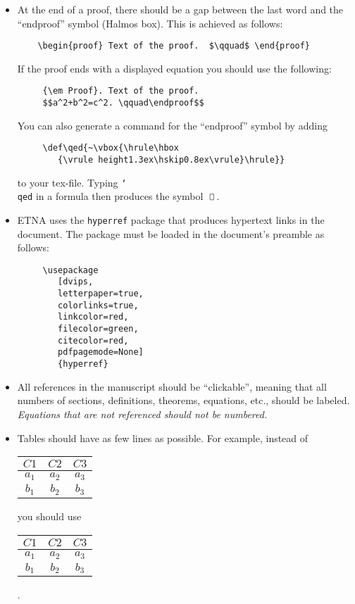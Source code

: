 \documentclass{scrartcl}
\def\qed{~\vbox{\hrule\hbox{\vrule height1.3ex\hskip0.8ex\vrule}\hrule}}
\begin{document}
\begin{itemize}
%
\item  At the end of a proof, there should be a gap between the last word and
  the ``endproof'' symbol (Halmos box). This is achieved as follows:
%
\begin{verbatim}
    \begin{proof} Text of the proof.  $\qquad$ \end{proof}
\end{verbatim}
%
If the proof ends with a displayed equation you should use the following:
%
\begin{verbatim}
     {\em Proof}. Text of the proof.
     $$a^2+b^2=c^2. \qquad\endproof$$
\end{verbatim}
%
You can also generate a command for the ``endproof'' symbol by adding
%
\begin{verbatim}
     \def\qed{~\vbox{\hrule\hbox
        {\vrule height1.3ex\hskip0.8ex\vrule}\hrule}}
\end{verbatim}
%
to your tex-file. Typing \texttt{\char`\\qed} in a formula then produces
the symbol $\qed\,$.
%
\item ETNA uses the \texttt{hyperref} package that produces hypertext links in
  the document. The package must be loaded in the document's preamble as
  follows:
%
\begin{verbatim}
     \usepackage
        [dvips,
        letterpaper=true,
        colorlinks=true,
        linkcolor=red,
        filecolor=green,
        citecolor=red,
        pdfpagemode=None]
        {hyperref}
\end{verbatim}

\item All references in the manuscript should be ``clickable'', meaning that
  all numbers of sections, definitions, theorems, equations, etc., should be
  labeled. \emph{Equations that are not referenced should not be numbered.}
%
\item Tables should have as few lines as possible. For example, instead of
\begin{table}[h]
  \centering
  \begin{tabular}{|c|c|c|}\hline
  $C1$ & $C2$ & $C3$ \\ \hline
  $a_1$ & $a_2$ & $a_3$ \\ \hline
  $b_1$ & $b_2$ & $b_3$ \\ \hline
  \end{tabular}
\end{table}
you should use
\begin{table}[h]
  \centering
  \begin{tabular}{c|c|c}
  $C1$ & $C2$ & $C3$ \\ \hline
  $a_1$ & $a_2$ & $a_3$ \\
  $b_1$ & $b_2$ & $b_3$
  \end{tabular}.
\end{table}


\end{itemize}
\end{document}
